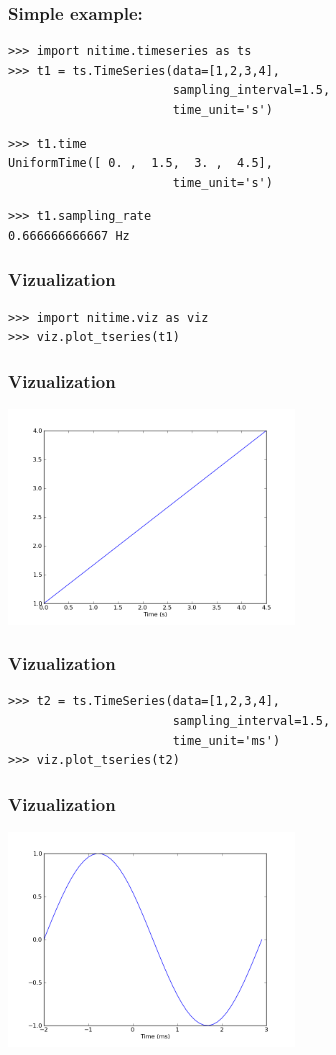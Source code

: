 \documentclass{beamer}
\begin{document}
\begin{frame}[fragile]
\frametitle{Simple example:}
\pause
\begin{lstlisting}
>>> import nitime.timeseries as ts 
>>> t1 = ts.TimeSeries(data=[1,2,3,4],
                       sampling_interval=1.5,
                       time_unit='s')
\end{lstlisting}
\pause
\begin{lstlisting}
>>> t1.time
UniformTime([ 0. ,  1.5,  3. ,  4.5], 
                       time_unit='s')
\end{lstlisting}

\pause
\begin{lstlisting}
>>> t1.sampling_rate
0.666666666667 Hz
\end{lstlisting}
\end{frame}

\begin{frame}[fragile]
\frametitle{Vizualization}
\pause
\begin{lstlisting}
>>> import nitime.viz as viz
>>> viz.plot_tseries(t1)
\end{lstlisting}
\end{frame}

\begin{frame}
\frametitle{Vizualization}
\includegraphics[height=5.7cm]{figures/simple_viz}
\end{frame}

\begin{frame}[fragile]
\frametitle{Vizualization}
\begin{lstlisting}
>>> t2 = ts.TimeSeries(data=[1,2,3,4],
                       sampling_interval=1.5,
                       time_unit='ms')
>>> viz.plot_tseries(t2)
\end{lstlisting}
\end{frame}

\begin{frame}
\frametitle{Vizualization}
\includegraphics[height=5.7cm]{figures/simple_viz2}
\end{frame}
\end{document}
